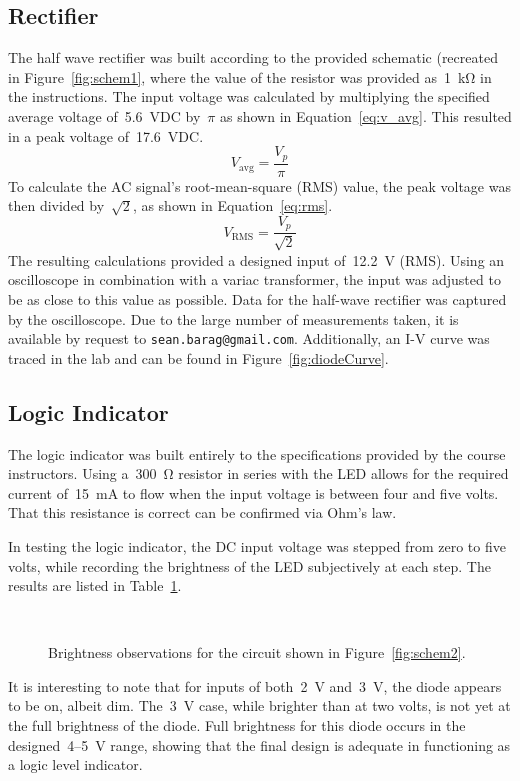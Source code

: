 \subsection{Rectifier}
The half wave rectifier was built according to the provided schematic (recreated
in Figure~\ref{fig:schem1}, where the value of the resistor was provided
as~\SI{1}{\kilo\ohm} in the instructions.  The input voltage was calculated by
multiplying the specified average voltage of~\SI{5.6}{\volt}DC by~$\pi$ as
shown in Equation~\ref{eq:v_avg}.  This resulted in a peak voltage
of~\SI{17.6}{\volt}DC.
%
\begin{equation}
	V_\text{avg} = \frac{V_p}{\pi}
	\label{eq:v_avg}
\end{equation}
%
To calculate the AC signal's root-mean-square (RMS) value, the peak voltage was
then divided by~$\sqrt{2}$, as shown in Equation~\ref{eq:rms}.
%
\begin{equation}
	V_\text{RMS} = \frac{V_p}{\sqrt{2}}
	\label{eq:rms}
\end{equation}
%
The resulting calculations provided a designed input of~\SI{12.2}{\volt} (RMS).
Using an oscilloscope in combination with a variac transformer, the input was
adjusted to be as close to this value as possible. Data for the half-wave
rectifier was captured by the oscilloscope.  Due to the large number of
measurements taken, it is available by request to
\texttt{sean.barag@gmail.com}.  Additionally, an I-V curve was traced in the
lab and can be found in Figure~\ref{fig:diodeCurve}.

\subsection{Logic Indicator}
The logic indicator was built entirely to the specifications provided by the
course instructors.  Using a~\SI{300}{\ohm} resistor in series with the LED
allows for the required current of~\SI{15}{\milli\ampere} to flow when the
input voltage is between four and five volts.  That this resistance is correct
can be confirmed via Ohm's law.

In testing the logic indicator, the DC input voltage was stepped from zero to
five volts, while recording the brightness of the LED subjectively at each
step.  The results are listed in Table~\ref{tab:ckt2data}.
%
\begin{figure}[H]
	\centering
	\\
	\parbox{4.5in}{
	\caption{Brightness observations for the circuit shown in
		Figure~\ref{fig:schem2}.}
	\label{tab:ckt2data}}
\end{figure}
%
It is interesting to note that for inputs of both~\SI{2}{\volt}
and~\SI{3}{\volt}, the diode appears to be on, albeit dim.  The~\SI{3}{\volt}
case, while brighter than at two volts, is not yet at the full brightness of
the diode.  Full brightness for this diode occurs in the
designed~4--\SI{5}{\volt} range, showing that the final design is adequate in
functioning as a logic level indicator.

